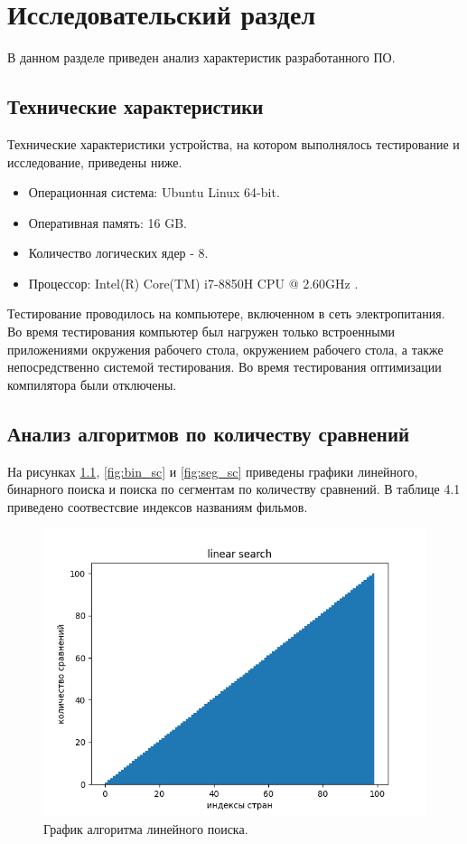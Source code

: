 \chapter{Исследовательский раздел}

В данном разделе приведен анализ характеристик разработанного ПО.

\section{Технические характеристики}

Технические характеристики устройства, на котором выполнялось тестирование и исследование, приведены ниже.

\begin{itemize}
	\item Операционная система: Ubuntu Linux 64-bit.
	\item Оперативная память: 16 GB.
	\item Количество логических ядер - 8.
	\item Процессор: Intel(R) Core(TM) i7-8850H CPU @ 2.60GHz \cite{intel}.
\end{itemize}

Тестирование проводилось на компьютере, включенном в сеть электропитания. Во время тестирования компьютер был нагружен только встроенными приложениями окружения рабочего стола, окружением рабочего стола, а также непосредственно системой тестирования. Во время тестирования оптимизации компилятора были отключены.

\section{Анализ алгоритмов по количеству сравнений}

На рисунках \ref{fig:lin_sc}, \ref{fig:bin_sc} и \ref{fig:seg_sc} приведены графики линейного, бинарного поиска и поиска по сегментам по количеству сравнений. В таблице 4.1 приведено соотвестсвие индексов названиям фильмов.

\begin{figure}[H]
	\centering
	\includegraphics[scale=0.9]{inc/lin.png}
	\caption{График алгоритма линейного поиска.}
	\label{fig:lin_sc}
\end{figure}

